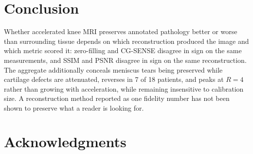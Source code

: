 \documentclass[letterpaper]{article} %
\begin{document}
\section{Conclusion}

Whether accelerated knee MRI preserves annotated pathology better or worse than
surrounding tissue depends on which reconstruction produced the image and which
metric scored it: zero-filling and CG-SENSE disagree in sign on the same
measurements, and SSIM and PSNR disagree in sign on the same reconstruction. The
aggregate additionally conceals meniscus tears being preserved while cartilage
defects are attenuated, reverses in 7 of 18 patients, and peaks at $R{=}4$
rather than growing with acceleration, while remaining insensitive to
calibration size. A reconstruction method reported as one fidelity number has
not been shown to preserve what a reader is looking for.

\section*{Acknowledgments}



\end{document}
